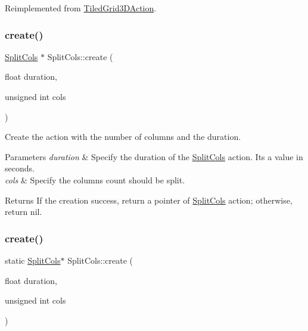Reimplemented from \hyperlink{classTiledGrid3DAction_a689fd377cc0abae91db7def106529b53}{Tiled\+Grid3\+D\+Action}.

\mbox{\label{classSplitCols_a1d2e0205d47c575d4d931b9a6f5e3f7c}} 
\subsubsection{\texorpdfstring{create()}{create()}\hspace{0.1cm}{\footnotesize\ttfamily [1/2]}}
{\footnotesize\ttfamily \hyperlink{classSplitCols}{Split\+Cols} $\ast$ Split\+Cols\+::create (\begin{DoxyParamCaption}\item[{float}]{duration,  }\item[{unsigned int}]{cols }\end{DoxyParamCaption})\hspace{0.3cm}{\ttfamily [static]}}



Create the action with the number of columns and the duration. 


\begin{DoxyParams}{Parameters}
{\em duration} & Specify the duration of the \hyperlink{classSplitCols}{Split\+Cols} action. It\textquotesingle{}s a value in seconds. \\
\hline
{\em cols} & Specify the columns count should be split. \\
\hline
\end{DoxyParams}
\begin{DoxyReturn}{Returns}
If the creation success, return a pointer of \hyperlink{classSplitCols}{Split\+Cols} action; otherwise, return nil. 
\end{DoxyReturn}
\mbox{\label{classSplitCols_a3aa5b831123bbe72a0e0cdae8e9032a1}} 
\subsubsection{\texorpdfstring{create()}{create()}\hspace{0.1cm}{\footnotesize\ttfamily [2/2]}}
{\footnotesize\ttfamily static \hyperlink{classSplitCols}{Split\+Cols}$\ast$ Split\+Cols\+::create (\begin{DoxyParamCaption}\item[{float}]{duration,  }\item[{unsigned int}]{cols }\end{DoxyParamCaption})\hspace{0.3cm}{\ttfamily [static]}}



